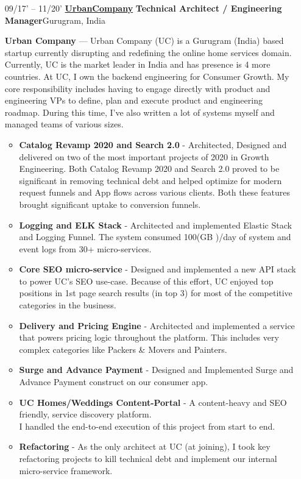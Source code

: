 \documentclass{article}
\begin{document}
\begin{itemize}[leftmargin=-1ex]
\begin{itemize}
	\end{itemize}\vspace{5pt}
	
	\item[09/17' – 11/20'] \href{https://urbanclap.com/}{\textbf{UrbanCompany}} \textbf{Technical Architect / Engineering Manager}\hfill Gurugram, India
	
	\item[]  \textbf{Urban Company} --- Urban Company (UC) is a Gurugram (India) based startup currently disrupting and redefining the online home services domain. Currently, UC is the market leader in India and has presence is 4 more countries. At UC, I own the backend engineering for Consumer Growth. My core responsibility includes having to engage directly with product and engineering VPs to define, plan and execute product and engineering roadmap. During this time, I've also written a lot of systems myself and managed teams of various sizes. \vspace{5pt}

	\begin{itemize} \setlength\itemsep{0.5em}
		
		\item {\textbf{Catalog Revamp 2020 and Search 2.0}} - Architected, Designed and delivered on two of the most important projects of 2020 in Growth Engineering. Both Catalog Revamp 2020 and Search 2.0 proved to be significant in removing technical debt and helped optimize for modern request funnels and App flows across various clients. Both these features brought significant uptake to conversion funnels.
		\item {\textbf{Logging and ELK Stack}} - Architected and implemented Elastic Stack and Logging Funnel. The system consumed 100(GB )/day of system and event logs from 30+ micro-services. 		
		\item {\textbf{Core SEO micro-service}} - Designed and implemented a new API stack to power UC's SEO use-case. Because of this effort, UC enjoyed top positions in 1st page search results (in top 3) for most of the competitive categories in the business.  
		\item {\textbf{Delivery and Pricing  Engine}} - Architected and implemented a service that powers pricing logic throughout the platform. This includes very complex categories like Packers \& Movers and Painters.
		\item {\textbf{Surge and Advance Payment}} - Designed and Implemented Surge and Advance Payment construct on our consumer app.
		\item \textbf{UC Homes/Weddings Content-Portal} - A content-heavy and SEO friendly, service discovery platform. \\ I handled the end-to-end execution of this project from start to end. 
		\item {\textbf{Refactoring}} - As the only architect at UC (at joining), I took key refactoring projects to kill technical debt and implement our internal micro-service framework.
	\end{itemize}\vspace{5pt}
	

\end{itemize}
\end{document}
